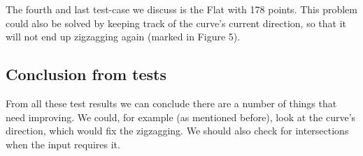     \noindent The fourth and last test-case we discuss is the Flat with 178 points. This problem could also be solved by keeping track of the curve's current direction, so that it will not end up zigzagging again (marked in Figure 5).

    \subsection{Conclusion from tests}
    From all these test results we can conclude there are a number of things that need improving. We could, for example (as mentioned before), look at the curve's direction, which would fix the zigzagging. We should also check for intersections when the input requires it. 